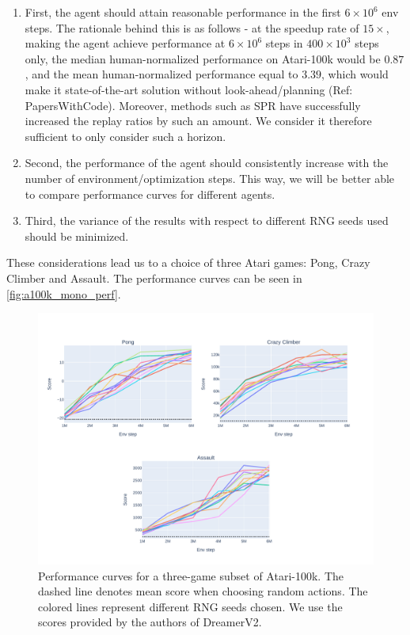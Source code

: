 \documentclass[twoside,11pt]{article}
\begin{document}
\begin{enumerate}
  \item First, the agent should attain reasonable performance in the first $6 \times 10^6$ env steps. The rationale behind this is as follows - at the speedup rate of $15\times$, making the agent achieve performance at $6 \times 10^6$ steps in $400 \times 10^3$ steps only, the median human-normalized performance on Atari-100k would be $0.87$, and the mean human-normalized performance equal to $3.39$, which would make it state-of-the-art solution without look-ahead/planning (Ref: PapersWithCode). Moreover, methods such as SPR have successfully increased the replay ratios by such an amount. We consider it therefore sufficient to only consider such a horizon.
  \item Second, the performance of the agent should consistently increase with the number of environment/optimization steps. This way, we will be better able to compare performance curves for different agents.
  \item Third, the variance of the results with respect to different RNG seeds used should be minimized.
\end{enumerate}

These considerations lead us to a choice of three Atari games: Pong, Crazy Climber and Assault. The performance curves can be seen in \autoref{fig:a100k_mono_perf}.

\begin{figure}
  \centering
  \includegraphics[width=0.8\linewidth,height=0.8\paperheight,keepaspectratio]{assets/perf_curves.pdf}
  \caption{Performance curves for a three-game subset of Atari-100k. The dashed line denotes mean score when choosing random actions. The colored lines represent different RNG seeds chosen. We use the scores provided by the authors of DreamerV2.}
  \label{fig:a100k_mono_perf}
\end{figure}
\end{document}
